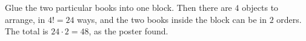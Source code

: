 Glue the two particular books into one block. Then there are $4$ objects to arrange, in $4!=24$ ways, and the two books inside the block can be in $2$ orders. The total is $24\cdot2=\boxed{48}$, as the poster found.
